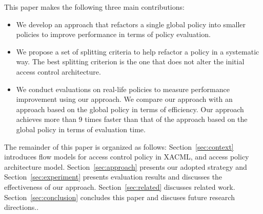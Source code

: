 This paper makes the following three main contributions:
\begin{itemize}
\item We develop an approach that refactors a single global policy into smaller policies to improve performance in terms of policy evaluation.
\item We propose a set of splitting criteria to help refactor a policy in a systematic way. The best splitting criterion is the one
that does not alter the initial access control architecture.
\item We conduct evaluations on real-life policies to measure performance improvement
using our approach. We compare our approach with an approach based on the global policy in terms of
efficiency. Our approach achieves more than 9 times faster than that of the approach based on the global policy in terms of evaluation time.
\end{itemize}


The remainder of this paper is organized as follows: Section~\ref{sec:context} introduces flow models for access control policy in XACML, and access policy architecture model.
Section~\ref{sec:approach} presents our adopted strategy and
Section~\ref{sec:experiment} presents evaluation results and discusses the effectiveness of our approach. Section~\ref{sec:related} discusses related work.
Section~\ref{sec:conclusion} concludes this paper and discuses future research directions..

